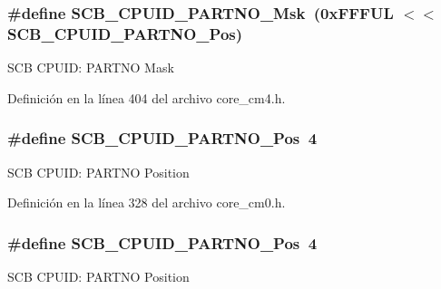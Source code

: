 \subsubsection[{\texorpdfstring{S\+C\+B\+\_\+\+C\+P\+U\+I\+D\+\_\+\+P\+A\+R\+T\+N\+O\+\_\+\+Msk}{SCB_CPUID_PARTNO_Msk}}]{\setlength{\rightskip}{0pt plus 5cm}\#define S\+C\+B\+\_\+\+C\+P\+U\+I\+D\+\_\+\+P\+A\+R\+T\+N\+O\+\_\+\+Msk~(0x\+F\+F\+F\+U\+L $<$$<$ S\+C\+B\+\_\+\+C\+P\+U\+I\+D\+\_\+\+P\+A\+R\+T\+N\+O\+\_\+\+Pos)}\hypertarget{group___c_m_s_i_s___s_c_b_ga98e581423ca016680c238c469aba546d}{}\label{group___c_m_s_i_s___s_c_b_ga98e581423ca016680c238c469aba546d}
S\+CB C\+P\+U\+ID\+: P\+A\+R\+T\+NO Mask 

Definición en la línea 404 del archivo core\+\_\+cm4.\+h.

\subsubsection[{\texorpdfstring{S\+C\+B\+\_\+\+C\+P\+U\+I\+D\+\_\+\+P\+A\+R\+T\+N\+O\+\_\+\+Pos}{SCB_CPUID_PARTNO_Pos}}]{\setlength{\rightskip}{0pt plus 5cm}\#define S\+C\+B\+\_\+\+C\+P\+U\+I\+D\+\_\+\+P\+A\+R\+T\+N\+O\+\_\+\+Pos~4}\hypertarget{group___c_m_s_i_s___s_c_b_ga705f68eaa9afb042ca2407dc4e4629ac}{}\label{group___c_m_s_i_s___s_c_b_ga705f68eaa9afb042ca2407dc4e4629ac}
S\+CB C\+P\+U\+ID\+: P\+A\+R\+T\+NO Position 

Definición en la línea 328 del archivo core\+\_\+cm0.\+h.

\subsubsection[{\texorpdfstring{S\+C\+B\+\_\+\+C\+P\+U\+I\+D\+\_\+\+P\+A\+R\+T\+N\+O\+\_\+\+Pos}{SCB_CPUID_PARTNO_Pos}}]{\setlength{\rightskip}{0pt plus 5cm}\#define S\+C\+B\+\_\+\+C\+P\+U\+I\+D\+\_\+\+P\+A\+R\+T\+N\+O\+\_\+\+Pos~4}\hypertarget{group___c_m_s_i_s___s_c_b_ga705f68eaa9afb042ca2407dc4e4629ac}{}\label{group___c_m_s_i_s___s_c_b_ga705f68eaa9afb042ca2407dc4e4629ac}
S\+CB C\+P\+U\+ID\+: P\+A\+R\+T\+NO Position 


